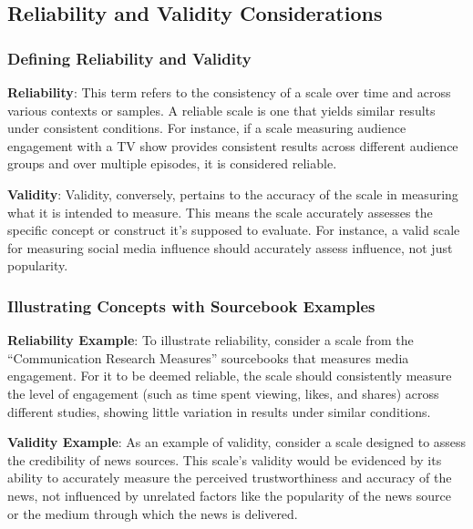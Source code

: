 \documentclass[
]{book}
\begin{document}
\hypertarget{reliability-and-validity-considerations}{%
\subsection*{Reliability and Validity Considerations}\label{reliability-and-validity-considerations}}

\hypertarget{defining-reliability-and-validity}{%
\subsubsection*{Defining Reliability and Validity}\label{defining-reliability-and-validity}}

\textbf{Reliability}: This term refers to the consistency of a scale over time and across various contexts or samples. A reliable scale is one that yields similar results under consistent conditions. For instance, if a scale measuring audience engagement with a TV show provides consistent results across different audience groups and over multiple episodes, it is considered reliable.

\textbf{Validity}: Validity, conversely, pertains to the accuracy of the scale in measuring what it is intended to measure. This means the scale accurately assesses the specific concept or construct it's supposed to evaluate. For instance, a valid scale for measuring social media influence should accurately assess influence, not just popularity.

\hypertarget{illustrating-concepts-with-sourcebook-examples}{%
\subsubsection*{Illustrating Concepts with Sourcebook Examples}\label{illustrating-concepts-with-sourcebook-examples}}

\textbf{Reliability Example}: To illustrate reliability, consider a scale from the ``Communication Research Measures'' sourcebooks that measures media engagement. For it to be deemed reliable, the scale should consistently measure the level of engagement (such as time spent viewing, likes, and shares) across different studies, showing little variation in results under similar conditions.

\textbf{Validity Example}: As an example of validity, consider a scale designed to assess the credibility of news sources. This scale's validity would be evidenced by its ability to accurately measure the perceived trustworthiness and accuracy of the news, not influenced by unrelated factors like the popularity of the news source or the medium through which the news is delivered.
\end{document}
